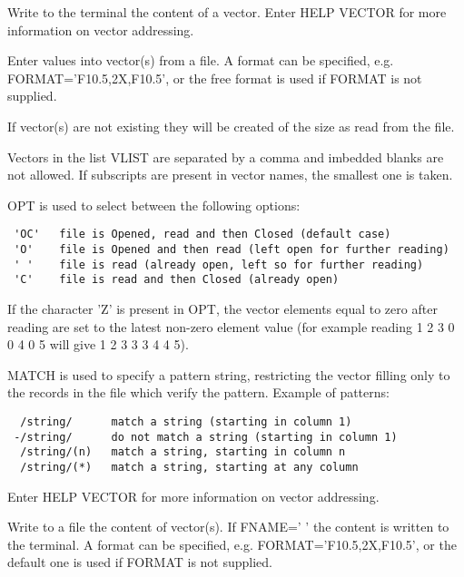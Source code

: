 \BEGARG
{}
\ENDARG
\BEGTEXT
Write to the terminal the content of a vector.
Enter HELP VECTOR for more information on vector addressing.
\ENDTEXT

\BEGARG
{}
\ENDARG
\BEGTEXT
Enter values into vector(s) from a file.
A format can be specified, e.g. FORMAT='F10.5,2X,F10.5',
or the free format is used if FORMAT is not supplied.

If vector(s) are not existing they will be created
of the size as read from the file.

Vectors in the list VLIST are separated by a comma and
imbedded blanks are not allowed. If subscripts are present
in vector names, the smallest one is taken.

OPT is used to select between the following options:
\begin{verbatim}
 'OC'   file is Opened, read and then Closed (default case)
 'O'    file is Opened and then read (left open for further reading)
 ' '    file is read (already open, left so for further reading)
 'C'    file is read and then Closed (already open)
\end{verbatim}
If the character 'Z' is present in OPT, the vector elements equal to zero
after reading are set to the latest non-zero element value
(for example reading 1 2 3 0 0 4 0 5 will give 1 2 3 3 3 4 4 5).

MATCH is used to specify a pattern string, restricting
the vector filling only to the records in the file which
verify the pattern. Example of patterns:
\begin{verbatim}
  /string/      match a string (starting in column 1)
 -/string/      do not match a string (starting in column 1)
  /string/(n)   match a string, starting in column n
  /string/(*)   match a string, starting at any column
\end{verbatim}
Enter HELP VECTOR for more information on vector addressing.
\ENDTEXT

\BEGARG
{}
\ENDARG
\BEGTEXT
Write to a file the content of vector(s).
If FNAME=' ' the content is written to the terminal.
A format can be specified, e.g. FORMAT='F10.5,2X,F10.5',
or the default one is used if FORMAT is not supplied.

